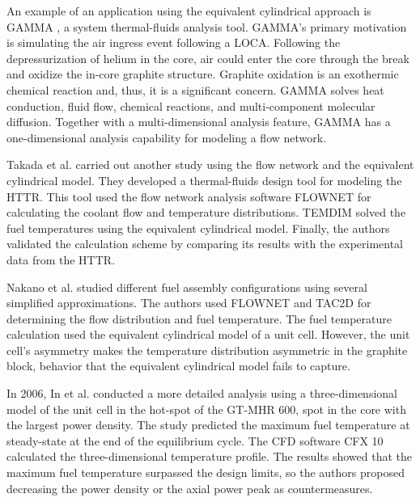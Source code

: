 An example of an application using the equivalent cylindrical approach is GAMMA \cite{lim_gamma_2006}\cite{no_multi-component_2007}, a system thermal-fluids analysis tool.
GAMMA's primary motivation is simulating the air ingress event following a LOCA.
Following the depressurization of helium in the core, air could enter the core through the break and oxidize the in-core graphite structure.
Graphite oxidation is an exothermic chemical reaction and, thus, it is a significant concern.
GAMMA solves heat conduction, fluid flow, chemical reactions, and multi-component molecular diffusion.
Together with a multi-dimensional analysis feature, GAMMA has a one-dimensional analysis capability for  modeling a flow network.

Takada et al. \cite{takada_core_2004} carried out another study using the flow network and the equivalent cylindrical model.
They developed a thermal-fluids design tool for modeling the \gls{HTTR}.
This tool used the flow network analysis software FLOWNET \cite{maruyama_verification_1988} for calculating the coolant flow and temperature distributions.
TEMDIM \cite{maruyama_verification_1988} solved the fuel temperatures using the equivalent cylindrical model.
Finally, the authors validated the calculation scheme by comparing its results with the experimental data from the \gls{HTTR}.

Nakano et al. \cite{nakano_conceptual_2008} studied different fuel assembly configurations using several simplified approximations.
The authors used FLOWNET and TAC2D for determining the flow distribution and fuel temperature.
The fuel temperature calculation used the equivalent cylindrical model of a unit cell.
However, the unit cell's asymmetry makes the temperature distribution asymmetric in the graphite block, behavior that the equivalent cylindrical model fails to capture.

In 2006, In et al. \cite{in_three-dimensional_2006} conducted a more detailed analysis using a three-dimensional model of the unit cell in the hot-spot of the GT-MHR 600, spot in the core with the largest power density.
The study predicted the maximum fuel temperature at steady-state at the end of the equilibrium cycle.
The \gls{CFD} software CFX 10 \cite{ansys_inc_cfx_2006} calculated the three-dimensional temperature profile.
The results showed that the maximum fuel temperature surpassed the design limits, so the authors proposed decreasing the power density or the axial power peak as countermeasures.

